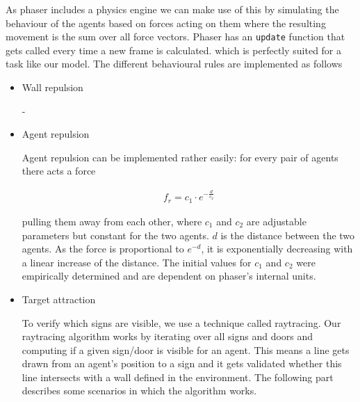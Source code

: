 \documentclass[11pt]{article}
\begin{document}
As phaser includes a physics engine we can make use of this by simulating the behaviour of the agents based on forces acting on them where the resulting movement is the sum over all force vectors. Phaser has an \texttt{update} function that gets called every time a new frame is calculated. which is perfectly suited for a task like our model. The different behavioural rules are implemented as follows

\begin{itemize}
    \item Wall repulsion
    
    -

    \item Agent repulsion
    
    Agent repulsion can be implemented rather easily: for every pair of agents there acts a force 
    
    \begin{align*}
    	f_r = c_1 \cdot e^{-\frac{d}{c_2}}
    \end{align*}
    
    pulling them away from each other, where $c_1$ and $c_2$ are adjustable parameters but constant for the two agents. $d$ is the distance between the two agents. As the force is proportional to $e^{-d}$, it is exponentially decreasing with a linear increase of the distance. The initial values for $c_1$ and $c_2$ were empirically determined and are dependent on phaser's internal units.

%    
%    
%    

    \item Target attraction
    
    To verify which signs are visible, we use a technique called raytracing. Our raytracing algorithm works by iterating over all signs and doors and computing if a given sign/door is visible for an agent. This means a line gets drawn from an agent's position to a sign and it gets validated whether this line intersects with a wall defined in the environment. The following part describes some scenarios in which the algorithm works.
    

\end{itemize}
\end{document}
